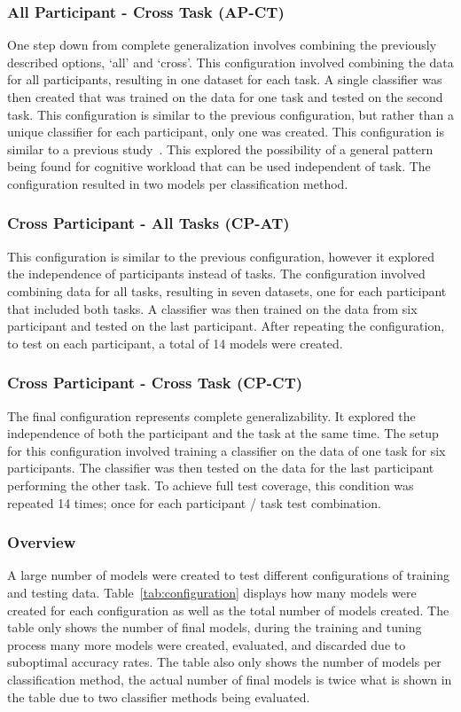 \documentclass[11pt]{article}
\begin{document}
		\subsubsection{All Participant - Cross Task (AP-CT)}
		One step down from complete generalization involves combining the previously described options, `all' and `cross'. This configuration involved combining the data for all participants, resulting in one dataset for each task. A single classifier was then created that was trained on the data for one task and tested on the second task. This configuration is similar to the previous configuration, but rather than a unique classifier for each participant, only one was created. This configuration is similar to a previous study~\cite{Ke}. This explored the possibility of a general pattern being found for cognitive workload that can be used independent of task. The configuration resulted in two models per classification method.
		
		\subsubsection{Cross Participant - All Tasks (CP-AT)}
		This configuration is similar to the previous configuration, however it explored the independence of participants instead of tasks. The configuration involved combining data for all tasks, resulting in seven datasets, one for each participant that included both tasks. A classifier was then trained on the data from six participant and tested on the last participant. After repeating the configuration, to test on each participant, a total of 14 models were created.
		
		\subsubsection{Cross Participant - Cross Task (CP-CT)}
		The final configuration represents complete generalizability. It explored the independence of both the participant and the task at the same time. The setup for this configuration involved training a classifier on the data of one task for six participants. The classifier was then tested on the data for the last participant performing the other task. To achieve full test coverage, this condition was repeated 14 times; once for each participant / task test combination.
		
		\subsubsection{Overview}
		A large number of models were created to test different configurations of training and testing data. Table~\ref{tab:configuration} displays how many models were created for each configuration as well as the total number of models created. The table only shows the number of final models, during the training and tuning process many more models were created, evaluated, and discarded due to suboptimal accuracy rates. The table also only shows the number of models per classification method, the actual number of final models is twice what is shown in the table due to two classifier methods being evaluated.
		
\end{document}
